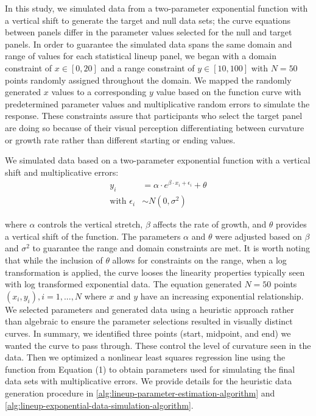 \documentclass[12pt]{article}
\begin{document}
In this study, we simulated data from a two-parameter exponential
function with a vertical shift to generate the target and null data
sets; the curve equations between panels differ in the parameter values
selected for the null and target panels. In order to guarantee the
simulated data spans the same domain and range of values for each
statistical lineup panel, we began with a domain constraint of
\(x\in [0,20]\) and a range constraint of \(y\in [10,100]\) with
\(N = 50\) points randomly assigned throughout the domain. We mapped the
randomly generated \(x\) values to a corresponding \(y\) value based on
the function curve with predetermined parameter values and
multiplicative random errors to simulate the response. These constraints
assure that participants who select the target panel are doing so
because of their visual perception differentiating between curvature or
growth rate rather than different starting or ending values.

We simulated data based on a two-parameter exponential function with a
vertical shift and multiplicative errors: \begin{align}
y_i & = \alpha\cdot e^{\beta\cdot x_i + \epsilon_i} + \theta \\
\text{with } \epsilon_i & \sim N(0, \sigma^2) \nonumber
\end{align}

where \(\alpha\) controls the vertical stretch, \(\beta\) affects the
rate of growth, and \(\theta\) provides a vertical shift of the
function. The parameters \(\alpha\) and \(\theta\) were adjusted based
on \(\beta\) and \(\sigma^2\) to guarantee the range and domain
constraints are met. It is worth noting that while the inclusion of
\(\theta\) allows for constraints on the range, when a log
transformation is applied, the curve looses the linearity properties
typically seen with log transformed exponential data. The equation
generated \(N = 50\) points \((x_i, y_i), i = 1,...,N\) where \(x\) and
\(y\) have an increasing exponential relationship. We selected
parameters and generated data using a heuristic approach rather than
algebraic to ensure the parameter selections resulted in visually
distinct curves. In summary, we identified three points (start,
midpoint, and end) we wanted the curve to pass through. These control
the level of curvature seen in the data. Then we optimized a nonlinear
least squares regression line using the function from Equation (1) to
obtain parameters used for simulating the final data sets with
multiplicative errors. We provide details for the heuristic data
generation procedure in \cref{alg:lineup-parameter-estimation-algorithm}
and \cref{alg:lineup-exponential-data-simulation-algorithm}.
\end{document}
